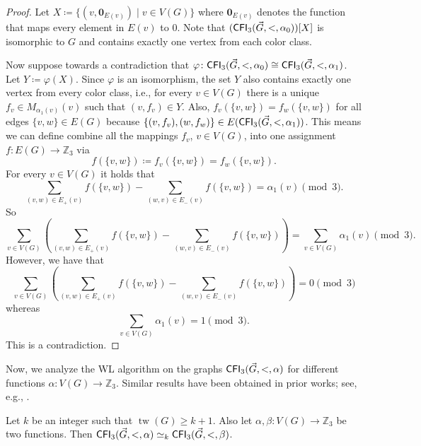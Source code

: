 \documentclass{theoretics}
\newcommand{\ZZ}{{\mathbb Z}}
\DeclareMathOperator{\tw}{tw}
\newcommand{\CFI}{{\sf CFI}}
\begin{document}
\begin{proof}
 Let $X \coloneqq \{(v,\mathbf{0}_{E(v)}) \mid v \in V(G)\}$ where $\mathbf{0}_{E(v)}$ denotes the function that maps every element in $E(v)$ to $0$.
 Note that $(\CFI_3(\vec{G},<,\alpha_0))[X]$ is isomorphic to $G$ and contains exactly one vertex from each color class.

 Now suppose towards a contradiction that $\varphi\colon\CFI_3(\vec{G},<,\alpha_0) \cong \CFI_3(\vec{G},<,\alpha_1)$.
 Let $Y \coloneqq \varphi(X)$.
 Since $\varphi$ is an isomorphism, the set $Y$ also contains exactly one vertex from every color class, i.e., for every $v \in V(G)$ there is a unique $f_v \in M_{\alpha_1(v)}(v)$ such that $(v,f_v) \in Y$.
 Also, $f_v(\{v,w\}) = f_w(\{v,w\})$ for all edges $\{v,w\} \in E(G)$ because $\{(v,f_v),(w,f_w)\} \in E(\CFI_3(\vec{G},<,\alpha_1))$.
 This means we can define combine all the mappings $f_v$, $v \in V(G)$, into one assignment $f \colon E(G) \to \ZZ_3$ via
 \[f(\{v,w\}) \coloneqq f_v(\{v,w\}) = f_w(\{v,w\}).\]
 For every $v \in V(G)$ it holds that
 \[\sum_{(v,w) \in E_+(v)} f(\{v,w\}) - \sum_{(w,v) \in E_-(v)} f(\{v,w\}) = \alpha_1(v) \pmod{3}.\]
 So
 \[\sum_{v \in V(G)} \left(\sum_{(v,w) \in E_+(v)} f(\{v,w\}) - \sum_{(w,v) \in E_-(v)} f(\{v,w\})\right) = \sum_{v \in V(G)}\alpha_1(v) \pmod{3}.\]
 However, we have that
 \[\sum_{v \in V(G)} \left(\sum_{(v,w) \in E_+(v)} f(\{v,w\}) - \sum_{(w,v) \in E_-(v)} f(\{v,w\})\right) = 0 \pmod{3}\]
 whereas
 \[\sum_{v \in V(G)}\alpha_1(v) = 1 \pmod{3}.\]
 This is a contradiction.
\end{proof}

Now, we analyze the WL algorithm on the graphs $\CFI_3(\vec{G},<,\alpha)$ for different functions $\alpha\colon V(G) \to \ZZ_3$.
Similar results have been obtained in prior works; see, e.g., \cite{DawarR07,Neuen24}.

\begin{lemma}
 \label{lem:cfi-indistinguishable}
 Let $k$ be an integer such that $\tw(G) \geq k+1$.
 Also let $\alpha,\beta\colon V(G) \to \ZZ_3$ be two functions.
 Then $\CFI_3(\vec{G},<,\alpha) \simeq_k \CFI_3(\vec{G},<,\beta)$.
\end{lemma}
\end{document}
